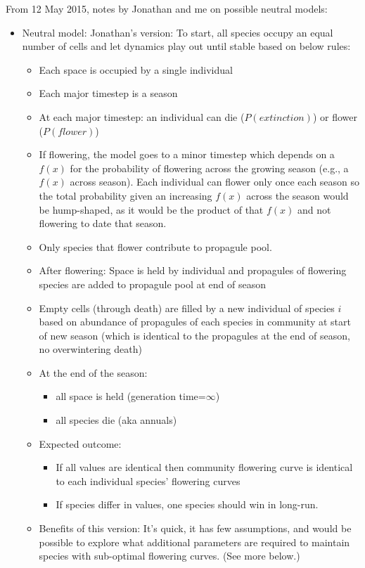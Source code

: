 \documentclass[11pt,a4paper]{article}
\begin{document}
From 12 May 2015, notes by Jonathan and me on possible neutral models:
\begin{itemize}
\item Neutral model: Jonathan's version:  To start, all species occupy an equal number of cells and let dynamics play out until stable based on below rules:
\begin{itemize}
\item Each space is occupied by a single individual
\item Each major timestep is a season
\item At each major timestep: an individual can die ($P(extinction)$) or flower ($P(flower)$)
\item If flowering, the model goes to a minor timestep which depends on a $f(x)$ for the probability of flowering across the growing season (e.g., a $f(x)$ across season). Each individual can flower only once each season so the total probability given an increasing $f(x)$ across the season would be hump-shaped, as it would be the product of that $f(x)$ and not flowering to date that season.
\item Only species that flower contribute to propagule pool.
\item After flowering: Space is held by individual and propagules of flowering species are added to propagule pool at end of season
\item Empty cells (through death) are filled by a new individual of species $i$ based on abundance of propagules of each species in community at start of new season (which is identical to the propagules at the end of season, no overwintering death)
\item At the end of the season:
\begin{itemize}
\item all space is held (generation time=$\infty$)
\item all species die (aka annuals)
\end{itemize}
\item Expected outcome:
\begin{itemize}
\item If all values are identical then community flowering curve is identical to each individual species' flowering curves
\item If species differ in values, one species should win in long-run.
\end{itemize}
\item Benefits of this version: It's quick, it has few assumptions, and would be possible to explore what additional parameters are required to maintain species with sub-optimal flowering curves. (See more below.)

\end{itemize}
\end{itemize}
\end{document}
